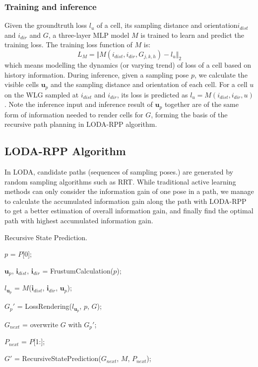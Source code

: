 \subsubsection{Training and inference}
Given the groundtruth loss $l_u$ of a cell, its sampling distance and orientation$i_{dist}$ and $i_{dir}$ and $G$, a three-layer MLP model $M$ is trained to learn and predict the training loss. The training loss function of $M$ is:
\begin{equation}
  L_M = \Vert M(i_{dist}, i_{dir}, G_{j,k,h}) - l_u \Vert_2
\end{equation}
which means modelling the dynamics (or varying trend) of loss of a cell based on history information.
During inference, given a sampling pose $p$, we calculate the visible cells $\bm{u}_p$ and the sampling distance and orientation of each cell. For a cell $u$ on the WLG sampled at $i_{dist}$ and $i_{dir}$, its loss is predicted as $l_u = M(i_{dist}, i_{dir}, u)$.
Note the inference input and inference result of $\bm{u}_p$ together are of the same form of information needed to render cells for $G$, forming the basis of the recursive path planning in LODA-RPP algorithm.


\subsection{LODA-RPP Algorithm}
In LODA, candidate paths (sequences of sampling poses.) are generated by random sampling algorithms such as RRT. 
While traditional active learning methods can only consider the information gain of one pose in a path, we manage to calculate the accumulated information gain along the path with LODA-RPP to get a better estimation of overall information gain, and finally find the optimal path with highest accumulated information gain.

\begin{algorithm}[h]
  \caption{Recursive State Prediction.}
  \label{alg:rsp}
  \BlankLine

  $p$ = $P$[0];

  $\bm{u}_p$, $\bm{i}_{dist}$, $\bm{i}_{dir}$ = FrustumCalculation($p$);

  $l_{\bm{u}_p}$ = $M$($\bm{i}_{dist}$, $\bm{i}_{dir}$, $\bm{u}_p$);

  $G_p'$ = LossRendering($l_{\bm{u}_p}$, $p$, $G$);

  $G_{next}$ = overwrite $G$ with $G_p'$;

  $P_{next}$ = $P$[1:];

  $G'$ = RecursiveStatePrediction($G_{next}$, $M$, $P_{next}$);
\end{algorithm}

